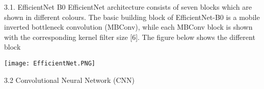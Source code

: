 3.1. EfficientNet B0
\hfill \break
EfficientNet architecture consists of seven blocks which are shown in different colours. The basic building block of EfficientNet-B0 is a mobile inverted bottleneck convolution (MBConv), while each MBConv block is shown with the corresponding kernel filter size [6]. The figure below shows the different block

\centering
\texttt{[image: EfficientNet.PNG]}
\hfill \break







3.2 Convolutional Neural Network (CNN)



